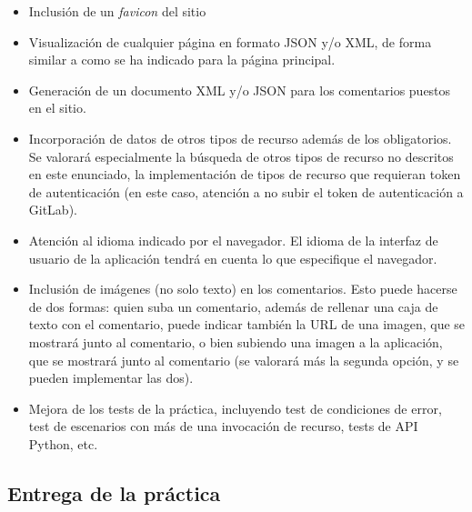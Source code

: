 \begin{itemize}
  \item Inclusión de un \emph{favicon} del sitio
  
  \item Visualización de cualquier página en formato JSON y/o XML, de forma similar a como se ha indicado para la página principal.

  \item Generación de un documento XML y/o JSON para los comentarios puestos en el sitio.

  \item Incorporación de datos de otros tipos de recurso además de los obligatorios. Se valorará especialmente la búsqueda de otros tipos de recurso no descritos en este enunciado, la implementación de tipos de recurso que requieran token de autenticación (en este caso, atención a no subir el token de autenticación a GitLab).
 
  \item Atención al idioma indicado por el navegador. El idioma de la interfaz de usuario de la aplicación tendrá en cuenta lo que especifique el navegador.

  \item Inclusión de imágenes (no solo texto) en los comentarios. Esto puede hacerse de dos formas: quien suba un comentario, además de rellenar una caja de texto con el comentario, puede indicar también la URL de una imagen, que se mostrará junto al comentario, o bien subiendo una imagen a la aplicación, que se mostrará junto al comentario (se valorará más la segunda opción, y se pueden implementar las dos).
    
  \item Mejora de los tests de la práctica, incluyendo test de condiciones de error, test de escenarios con más de una invocación de recurso, tests de API Python, etc.
\end{itemize}

\subsection{Entrega de la práctica}

